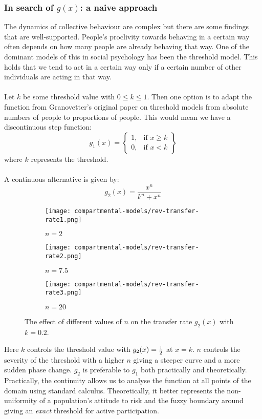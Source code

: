 \subsubsection{In search of $g(x)$: a naive approach}
The dynamics of collective behaviour are complex but there are some findings that are well-supported. People's proclivity towards behaving in a certain way often depends on how many people are already behaving that way. One of the dominant models of this in social psychology has been the threshold model. This holds that we tend to act in a certain way only if a certain number of other individuals are acting in that way\cite{threshold-models-social-influence}.\\
\\
Let $k$ be some threshold value with $0\leq k\leq1$. Then one option is to adapt the function from Granovetter's original paper on threshold models from absolute numbers of people to proportions of people. This would mean we have a discontinuous step function:\\
	\[
g_1(x) = \left\{\begin{array}{lr}
1, & \text{if } x\geq k\\
0, & \text{if } x< k
\end{array}\right\}
\]
where $k$ represents the threshold.\\
\\
A continuous alternative is given by:
\[g_2(x)=\frac{x^n}{k^n + x^n}\]
\begin{figure}
	\centering
	\begin{subfigure}{.46\textwidth}
		\centering
		\texttt{[image: compartmental-models/rev-transfer-rate1.png]}
		\caption{$n=2$}
	\end{subfigure}%
	\begin{subfigure}{.46\textwidth}
		\centering
		\texttt{[image: compartmental-models/rev-transfer-rate2.png]}
		\caption{$n=7.5$}
	\end{subfigure}
	\begin{subfigure}{.46\textwidth}
		\centering
		\texttt{[image: compartmental-models/rev-transfer-rate3.png]}
		\caption{$n=20$}
	\end{subfigure}
	\caption{The effect of different values of $n$ on the transfer rate $g_2(x)$ with $k=0.2$.}
	\label{fig:transfer-rate-n}
\end{figure}
Here $k$ controls the threshold value with $g_2(x)={1\over2}$ at $x=k$. $n$ controls the severity of the threshold with a higher $n$ giving a steeper curve and a more sudden phase change. $g_2$ is preferable to $g_1$ both practically and theoretically. Practically, the continuity allows us to analyse the function at all points of the domain using standard calculus. Theoretically, it better represents the non-uniformity of a population's attitude to risk and the fuzzy boundary around giving an \textit{exact} threshold for active participation.\\

